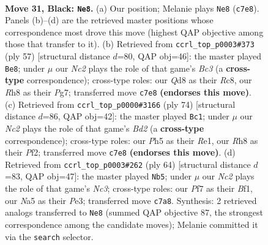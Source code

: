 \documentclass[11pt]{article}
\begin{document}
\clearpage

\begin{figure}[p]\centering
\begin{subfigure}{0.46\textwidth}\centering
\resizebox{\linewidth}{!}{%
\newchessgame
\chessboard[
  setfen={3q3r/2n2pk1/p5p1/n1Q1p2p/P3P1b1/N1PP3N/B2K1PPP/R7 b - - 2 31},
  showmover=false,
  pgfstyle=straightmove, color=movearrow, markmove={c7-e8}
]}
\caption{}
\end{subfigure}\hfill
\begin{subfigure}{0.46\textwidth}\centering
\resizebox{\linewidth}{!}{%
\newchessgame
\chessboard[
  setfen={2r3k1/p4pp1/1nbQp2p/q1p5/4P2P/2N2PP1/PP1R4/5BK1 b - - 0 29},
  showmover=false,
  pgfstyle=straightmove, color=movearrow, markmove={c6-e8}
]}
\caption{}
\end{subfigure}
\\[4pt]
\begin{subfigure}{0.46\textwidth}\centering
\resizebox{\linewidth}{!}{%
\newchessgame
\chessboard[
  setfen={8/3r1p1k/pp3bp1/2np3p/3N4/qPP4P/2QB1PP1/4R1K1 w - - 5 38},
  showmover=false,
  pgfstyle=straightmove, color=movearrow, markmove={d2-c1}
]}
\caption{}
\end{subfigure}\hfill
\begin{subfigure}{0.46\textwidth}\centering
\resizebox{\linewidth}{!}{%
\newchessgame
\chessboard[
  setfen={2r5/5p1k/1pb1p1p1/2n1q2p/2P5/2N1P2P/P1QR1PP1/5BK1 w - - 5 33},
  showmover=false,
  pgfstyle=straightmove, color=movearrow, markmove={c3-b5}
]}
\caption{}
\end{subfigure}
\caption{\textbf{Move 31, Black: \texttt{Ne8}.} (a) Our position; Melanie plays \texttt{Ne8} (\texttt{c7e8}). Panels (b)--(d) are the retrieved master positions whose correspondence most drove this move (highest QAP objective among those that transfer to it). (b) Retrieved from \texttt{ccrl\_top\_p0003\#373} (ply 57) [structural distance $d$=80, QAP obj=46]: the master played \texttt{Be8}; under $\mu$ our \emph{Nc2} plays the role of that game's \emph{Bc3} (a \textbf{cross-type} correspondence); cross-type roles: our \emph{Q}d8 as their \emph{R}c8, our \emph{R}h8 as their \emph{P}g7; transferred move \texttt{c7e8} \textbf{(endorses this move)}. (c) Retrieved from \texttt{ccrl\_top\_p0000\#3166} (ply 74) [structural distance $d$=86, QAP obj=42]: the master played \texttt{Bc1}; under $\mu$ our \emph{Nc2} plays the role of that game's \emph{Bd2} (a \textbf{cross-type} correspondence); cross-type roles: our \emph{P}h5 as their \emph{R}e1, our \emph{R}h8 as their \emph{P}f2; transferred move \texttt{c7e8} \textbf{(endorses this move)}. (d) Retrieved from \texttt{ccrl\_top\_p0003\#262} (ply 64) [structural distance $d$=83, QAP obj=47]: the master played \texttt{Nb5}; under $\mu$ our \emph{Nc2} plays the role of that game's \emph{Nc3}; cross-type roles: our \emph{P}f7 as their \emph{B}f1, our \emph{N}a5 as their \emph{P}e3; transferred move \texttt{c7a8}. Synthesis: 2 retrieved analogs transferred to \texttt{Ne8} (summed QAP objective 87, the strongest correspondence among the candidate moves); Melanie committed it via the \texttt{search} selector.}
\label{fig:thought-m61}
\end{figure}
\end{document}
